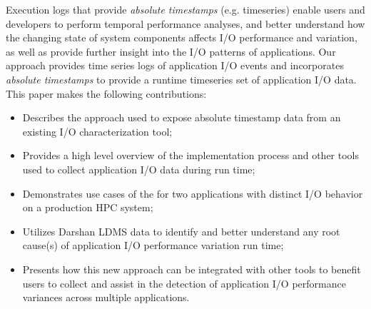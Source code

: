 
Execution logs that provide \emph{absolute timestamps}
(e.g. timeseries) enable users and developers to perform temporal
performance analyses, and better understand how the changing state of
system components affects I/O performance and variation, as well as provide
further insight into the I/O patterns of applications. 
Our \Darshan{} approach provides time series logs of application I/O
events and incorporates \emph{absolute timestamps} to provide a runtime 
timeseries set of application I/O data. 
  This paper makes the following contributions:

\begin{itemize}
	\item Describes the approach used to expose absolute timestamp
          data from an existing I/O characterization tool;
       	\item Provides a high level overview of the implementation
          process and other tools used to collect application I/O data
          during run time;
  	\item Demonstrates use cases of the \connector{} for two
          applications with distinct I/O behavior on a production HPC
          system;
        \item Utilizes Darshan LDMS data to identify and better
          understand any root cause(s) of application I/O performance
          variation run time;
	\item Presents how this new approach can be integrated with
          other tools to benefit users to collect and assist in the
          detection of application I/O performance variances across
          multiple applications.
\end{itemize}

